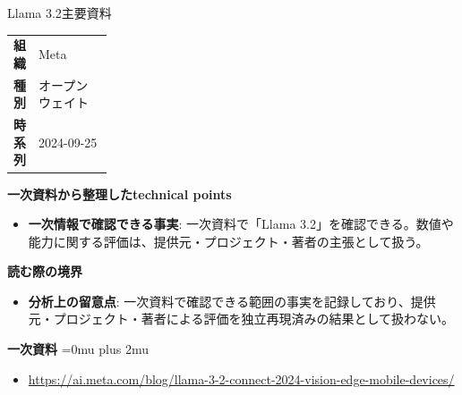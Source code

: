 \begin{technicalnote}{Llama 3.2}{主要資料}
\begingroup
\begin{tabularx}{\linewidth}{@{}>{\bfseries}p{0.22\linewidth}X@{}}
組織 & Meta \\
種別 & オープンウェイト \\
時系列 & 2024-09-25 \\
\end{tabularx}
\smallskip
{\bfseries 一次資料から整理したtechnical points}
\begin{itemize}[leftmargin=1.5em,itemsep=0.35em]
\item \textbf{一次情報で確認できる事実}: 一次資料で「Llama 3.2」を確認できる。数値や能力に関する評価は、提供元・プロジェクト・著者の主張として扱う。
\end{itemize}
\begin{minipage}{\linewidth}
{\bfseries 読む際の境界}
\begin{itemize}[leftmargin=1.5em,itemsep=0.35em]
\item \textbf{分析上の留意点}: 一次資料で確認できる範囲の事実を記録しており、提供元・プロジェクト・著者による評価を独立再現済みの結果として扱わない。
\end{itemize}
\begin{samepage}
{\bfseries 一次資料}
\begingroup\sloppy
\Urlmuskip=0mu plus 2mu\relax
\begin{itemize}[leftmargin=1.5em,itemsep=0.25em]
\item {\scriptsize\url{https://ai.meta.com/blog/llama-3-2-connect-2024-vision-edge-mobile-devices/}}
\end{itemize}
\endgroup
\end{samepage}
\end{minipage}
\endgroup
\end{technicalnote}
\medskip

